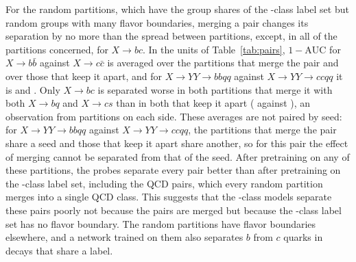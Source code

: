 \documentclass[11pt]{article}
\newcommand{\Kcoarse}{\VocabSizeRonesixQone}
\newcommand{\oma}{\ensuremath{1-\mathrm{AUC}}}
\begin{document}
For the \RandVtwoNPartitions{} random partitions, which have the group shares of the
\Kcoarse-class label set but random groups with many flavor boundaries, merging a pair changes
its separation by no more than the spread between partitions, except, in all of the partitions
concerned, for $X\to bc$. In the units of Table~\ref{tab:pairs}, $\oma$ for $X\to b\bar b$
against $X\to c\bar c$ is \MlstPairRandMergedBb{} averaged over the partitions that merge the
pair and \MlstPairRandApartBb{} over those that keep it apart, and for $X\to YY\to bbqq$ against
$X\to YY\to ccqq$ it is \MlstPairRandMergedBbqq{} and \MlstPairRandApartBbqq. Only $X\to bc$ is separated worse
in both partitions that merge it with both $X\to bq$ and $X\to cs$ than in both that keep it
apart (\MlstPairRandMergedBc{} against \MlstPairRandApartBc), an observation from
\MlstPairRandMergedBcN{} partitions on each side. These averages are not paired by seed: for $X\to YY\to bbqq$ against
$X\to YY\to ccqq$, the partitions that merge the pair share a seed and those that keep it
apart share another, so for this pair the effect of merging cannot be separated from that of the
seed. After pretraining on
any of these partitions, the probes separate every pair better than after pretraining on the
\Kcoarse-class label set, including the QCD pairs, which every random partition merges into a
single QCD class. This suggests that the \Kcoarse-class models separate these pairs poorly not because the
pairs are merged but because the \Kcoarse-class label set has no flavor boundary. The random
partitions have flavor boundaries elsewhere, and a network trained on them also separates $b$
from $c$ quarks in decays that share a label.
\end{document}
